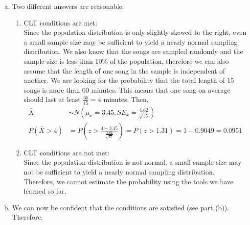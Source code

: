 \documentclass[11pt]{article}
\begin{document}
\begin{enumerate}
\begin{enumerate}[(a)]
\item Two different answers are reasonable. 
\begin{enumerate}[(1)]
\item CLT conditions are met: \\
Since the population distribution is only slightly skewed to the right, even a small sample size may be sufficient to yield a nearly normal sampling distribution. We also know that the songs are sampled randomly and the sample size is less than 10\% of the population, therefore we can also assume that the length of one song in the sample is independent of another.  We are looking for the probability that the total length of 15 songs is more than 60 minutes. This means that one song on average should last at least $\frac{60}{15} = 4$ minutes.  
Then,
\begin{align*}
\bar{X} &\sim N \left( \mu_{\bar{x}} = 3.45, SE_{\bar{x}} = \frac{1.62}{\sqrt{15}}  \right)  \\
P(\bar{X} > 4) &= P \left( z > \frac{4 - 3.45}{\frac{1.62}{\sqrt{15}}} \right)= P(z > 1.31) = 1 - 0.9049 = 0.0951
\end{align*}

\item CLT conditions are not met: \\
Since the population distribution is not normal, a small sample size may not be sufficient to yield a nearly normal sampling distribution. Therefore, we cannot estimate the probability using the tools we have learned so far.
\end{enumerate}

\item We can now be confident that the conditions are satisfied (see part (b)). Therefore,


\end{enumerate}
\end{enumerate}
\end{document}
